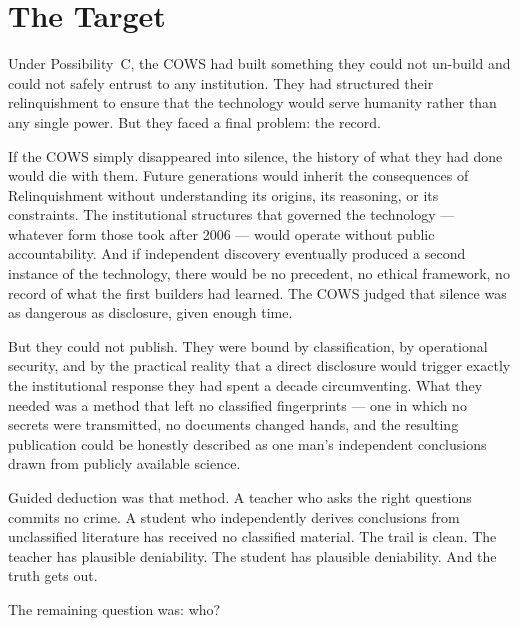 

\chapter*{The Target}

Under Possibility~C, the COWS had built something they could not un-build and could not safely entrust to any institution. They had structured their relinquishment to ensure that the technology would serve humanity rather than any single power. But they faced a final problem: the record.

If the COWS simply disappeared into silence, the history of what they had done would die with them. Future generations would inherit the consequences of Relinquishment without understanding its origins, its reasoning, or its constraints. The institutional structures that governed the technology --- whatever form those took after 2006 --- would operate without public accountability. And if independent discovery eventually produced a second instance of the technology, there would be no precedent, no ethical framework, no record of what the first builders had learned. The COWS judged that silence was as dangerous as disclosure, given enough time.

But they could not publish. They were bound by classification, by operational security, and by the practical reality that a direct disclosure would trigger exactly the institutional response they had spent a decade circumventing. What they needed was a method that left no classified fingerprints --- one in which no secrets were transmitted, no documents changed hands, and the resulting publication could be honestly described as one man's independent conclusions drawn from publicly available science.

Guided deduction was that method. A teacher who asks the right questions commits no crime. A student who independently derives conclusions from unclassified literature has received no classified material. The trail is clean. The teacher has plausible deniability. The student has plausible deniability. And the truth gets out.

The remaining question was: who?


